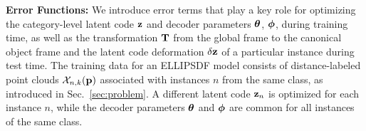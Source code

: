 {\vspace{1ex}\bf \noindent Error Functions: }%
We introduce error terms that play a key role for optimizing the category-level latent code $\mathbf{z}$ and decoder parameters $\boldsymbol{\theta}$, $\boldsymbol{\phi}$, during training time, as well as the transformation $\mathbf{T}$ from the global frame to the canonical object frame and the latent code deformation $\delta\mathbf{z}$ of a particular instance during test time. The training data for an ELLIPSDF model consists of distance-labeled point clouds ${\cal X}_{n,k}(\mathbf{p})$ associated with instances $n$ from the same class, as introduced in Sec.~\ref{sec:problem}. A different latent code $\mathbf{z}_n$ is optimized for each instance $n$, while the decoder parameters $\boldsymbol{\theta}$ and $\boldsymbol{\phi}$ are common for all instances of the same class. 





